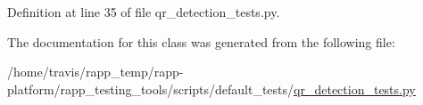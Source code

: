 Definition at line 35 of file qr\-\_\-detection\-\_\-tests.\-py.



The documentation for this class was generated from the following file\-:\begin{DoxyCompactItemize}
\item 
/home/travis/rapp\-\_\-temp/rapp-\/platform/rapp\-\_\-testing\-\_\-tools/scripts/default\-\_\-tests/\hyperlink{qr__detection__tests_8py}{qr\-\_\-detection\-\_\-tests.\-py}\end{DoxyCompactItemize}

